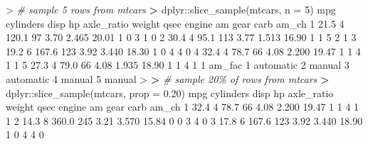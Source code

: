\documentclass[
]{book}
\newenvironment{Shaded}{\begin{snugshade}}{\end{snugshade}}
\newcommand{\AttributeTok}[1]{\textcolor[rgb]{0.77,0.63,0.00}{#1}}
\newcommand{\CommentTok}[1]{\textcolor[rgb]{0.56,0.35,0.01}{\textit{#1}}}
\newcommand{\DecValTok}[1]{\textcolor[rgb]{0.00,0.00,0.81}{#1}}
\newcommand{\ErrorTok}[1]{\textcolor[rgb]{0.64,0.00,0.00}{\textbf{#1}}}
\newcommand{\FloatTok}[1]{\textcolor[rgb]{0.00,0.00,0.81}{#1}}
\newcommand{\FunctionTok}[1]{\textcolor[rgb]{0.00,0.00,0.00}{#1}}
\newcommand{\NormalTok}[1]{#1}
\newcommand{\SpecialCharTok}[1]{\textcolor[rgb]{0.00,0.00,0.00}{#1}}
\begin{document}
\begin{Shaded}
\begin{Highlighting}[]
\SpecialCharTok{\textgreater{}} \CommentTok{\# sample 5 rows from mtcars}
\ErrorTok{\textgreater{}}\NormalTok{ dplyr}\SpecialCharTok{::}\FunctionTok{slice\_sample}\NormalTok{(mtcars, }\AttributeTok{n =} \DecValTok{5}\NormalTok{)}
\NormalTok{   mpg cylinders  disp  hp axle\_ratio weight  qsec engine am gear carb am\_ch}
\DecValTok{1} \FloatTok{21.5}         \DecValTok{4} \FloatTok{120.1}  \DecValTok{97}       \FloatTok{3.70}  \FloatTok{2.465} \FloatTok{20.01}      \DecValTok{1}  \DecValTok{0}    \DecValTok{3}    \DecValTok{1}     \DecValTok{0}
\DecValTok{2} \FloatTok{30.4}         \DecValTok{4}  \FloatTok{95.1} \DecValTok{113}       \FloatTok{3.77}  \FloatTok{1.513} \FloatTok{16.90}      \DecValTok{1}  \DecValTok{1}    \DecValTok{5}    \DecValTok{2}     \DecValTok{1}
\DecValTok{3} \FloatTok{19.2}         \DecValTok{6} \FloatTok{167.6} \DecValTok{123}       \FloatTok{3.92}  \FloatTok{3.440} \FloatTok{18.30}      \DecValTok{1}  \DecValTok{0}    \DecValTok{4}    \DecValTok{4}     \DecValTok{0}
\DecValTok{4} \FloatTok{32.4}         \DecValTok{4}  \FloatTok{78.7}  \DecValTok{66}       \FloatTok{4.08}  \FloatTok{2.200} \FloatTok{19.47}      \DecValTok{1}  \DecValTok{1}    \DecValTok{4}    \DecValTok{1}     \DecValTok{1}
\DecValTok{5} \FloatTok{27.3}         \DecValTok{4}  \FloatTok{79.0}  \DecValTok{66}       \FloatTok{4.08}  \FloatTok{1.935} \FloatTok{18.90}      \DecValTok{1}  \DecValTok{1}    \DecValTok{4}    \DecValTok{1}     \DecValTok{1}
\NormalTok{     am\_fac}
\DecValTok{1}\NormalTok{ automatic}
\DecValTok{2}\NormalTok{    manual}
\DecValTok{3}\NormalTok{ automatic}
\DecValTok{4}\NormalTok{    manual}
\DecValTok{5}\NormalTok{    manual}
\SpecialCharTok{\textgreater{}} 
\ErrorTok{\textgreater{}} \CommentTok{\# sample 20\% of rows from mtcars}
\ErrorTok{\textgreater{}}\NormalTok{ dplyr}\SpecialCharTok{::}\FunctionTok{slice\_sample}\NormalTok{(mtcars, }\AttributeTok{prop =} \FloatTok{0.20}\NormalTok{)}
\NormalTok{   mpg cylinders  disp  hp axle\_ratio weight  qsec engine am gear carb am\_ch}
\DecValTok{1} \FloatTok{32.4}         \DecValTok{4}  \FloatTok{78.7}  \DecValTok{66}       \FloatTok{4.08}  \FloatTok{2.200} \FloatTok{19.47}      \DecValTok{1}  \DecValTok{1}    \DecValTok{4}    \DecValTok{1}     \DecValTok{1}
\DecValTok{2} \FloatTok{14.3}         \DecValTok{8} \FloatTok{360.0} \DecValTok{245}       \FloatTok{3.21}  \FloatTok{3.570} \FloatTok{15.84}      \DecValTok{0}  \DecValTok{0}    \DecValTok{3}    \DecValTok{4}     \DecValTok{0}
\DecValTok{3} \FloatTok{17.8}         \DecValTok{6} \FloatTok{167.6} \DecValTok{123}       \FloatTok{3.92}  \FloatTok{3.440} \FloatTok{18.90}      \DecValTok{1}  \DecValTok{0}    \DecValTok{4}    \DecValTok{4}     \DecValTok{0}

\end{Highlighting}
\end{Shaded}
\end{document}
